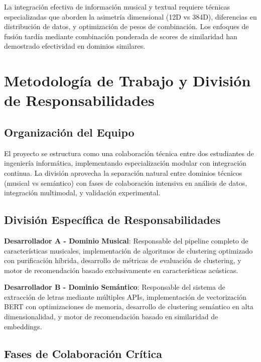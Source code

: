 \documentclass[12pt,a4paper]{article}
\begin{document}
La integración efectiva de información musical y textual requiere técnicas especializadas que aborden la asimetría dimensional (12D vs 384D), diferencias en distribución de datos, y optimización de pesos de combinación. Los enfoques de fusión tardía mediante combinación ponderada de scores de similaridad han demostrado efectividad en dominios similares.

\section{Metodología de Trabajo y División de Responsabilidades}

\subsection{Organización del Equipo}

El proyecto se estructura como una colaboración técnica entre dos estudiantes de ingeniería informática, implementando especialización modular con integración continua. La división aprovecha la separación natural entre dominios técnicos (musical vs semántico) con fases de colaboración intensiva en análisis de datos, integración multimodal, y validación experimental.

\subsection{División Específica de Responsabilidades}

\textbf{Desarrollador A - Dominio Musical}: Responsable del pipeline completo de características musicales, implementación de algoritmos de clustering optimizado con purificación híbrida, desarrollo de métricas de evaluación de clustering, y motor de recomendación basado exclusivamente en características acústicas.

\textbf{Desarrollador B - Dominio Semántico}: Responsable del sistema de extracción de letras mediante múltiples APIs, implementación de vectorización BERT con optimizaciones de memoria, desarrollo de clustering semántico en alta dimensionalidad, y motor de recomendación basado en similaridad de embeddings.

\subsection{Fases de Colaboración Crítica}
\end{document}
